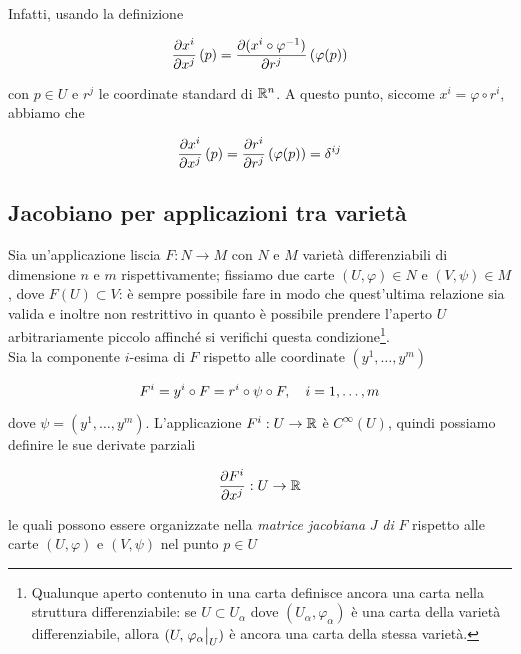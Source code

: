 Infatti, usando la definizione

\begin{equation}
	\pdv{x^{i}}{x^{j}} \, (p) = \pdv{(x^{i} \circ \varphi^{-1})}{r^{j}} \, (\varphi(p))
\end{equation}

con $ p \in U $ e $ r^{j} $ le coordinate standard di $ \mathbb{R}^{n} $. A questo punto, siccome $ x^{i} = \varphi \circ r^{i} $, abbiamo che

\begin{equation}
	\pdv{x^{i}}{x^{j}} \, (p) = \pdv{r^{i}}{r^{j}} \, (\varphi(p)) = \delta^{ij}
\end{equation}

\subsection{Jacobiano per applicazioni tra varietà}

Sia un'applicazione liscia $ F : N \to M $ con $ N $ e $ M $ varietà differenziabili di dimensione $ n $ e $ m $ rispettivamente; fissiamo due carte $ (U,\varphi) \in N $ e $ (V,\psi) \in M $, dove $ F(U) \subset V $: è sempre possibile fare in modo che quest'ultima relazione sia valida e inoltre non restrittivo in quanto è possibile prendere l'aperto $ U $ arbitrariamente piccolo affinché si verifichi questa condizione\footnote{%
	Qualunque aperto contenuto in una carta definisce ancora una carta nella struttura differenziabile: se $ U \subset U_{\alpha} $ dove $ (U_{\alpha},\varphi_{\alpha}) $ è una carta della varietà differenziabile, allora $ (U, \eval{\varphi_{\alpha}}_{U}) $ è ancora una carta della stessa varietà.%
}. \\
Sia la componente $ i $-esima di $ F $ rispetto alle coordinate $ (y^{1},\dots,y^{m}) $

\begin{equation}
	F^{i} = y^{i} \circ F = r^{i} \circ \psi \circ F \qcomma i=1,\dots,m
\end{equation}

dove $ \psi = (y^{1},\dots,y^{m}) $. L'applicazione $ F^{i} : U \to \mathbb{R} $ è $ C^{\infty}(U) $, quindi possiamo definire le sue derivate parziali

\begin{equation}
	\pdv{F^{i}}{x^{j}} : U \to \mathbb{R}
\end{equation}

le quali possono essere organizzate nella \textit{matrice jacobiana} $ J $ \textit{di} $ F $ rispetto alle carte $ (U,\varphi) $ e $ (V,\psi) $ nel punto $ p \in U $

